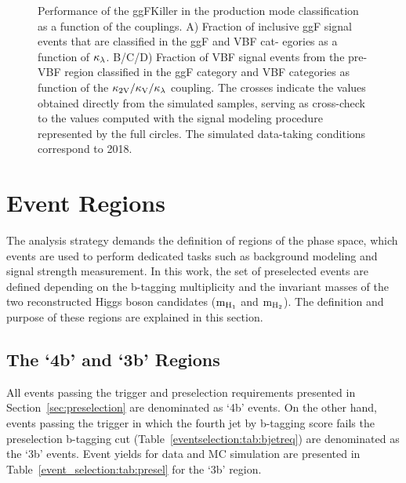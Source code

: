 \begin{figure}[htbp!]
\begin{center}
\end{center}
\caption[Performance of the ggFKiller in the production mode classification as a function of the couplings]{Performance of the ggFKiller in the production mode classification as a function of the couplings.  A) Fraction of inclusive ggF signal events that are classified in the ggF and VBF cat-
egories as a function of $\kappa_{\lambda}$. B/C/D) Fraction of VBF signal events from the pre-VBF region classified in the ggF category and VBF categories as function of the $\mathrm{\kappa_{2V} }/\mathrm{\kappa_{V} }/\kappa_{\lambda}$ coupling. The crosses indicate the values obtained directly from the simulated samples, serving as cross-check to the values computed with the signal modeling procedure represented by the full
circles. The simulated data-taking conditions correspond to 2018.}

\label{event_selection:fig:fractionggfvbfcategs_vs_kl}
\end{figure}

\clearpage

\section{Event Regions} \label{sec:regions}
The analysis strategy demands the definition of regions of the phase space, which events are used  to perform dedicated tasks such as background modeling and signal strength measurement. In this work, the set of preselected events are defined depending on the b-tagging multiplicity and the invariant masses of the two reconstructed Higgs boson candidates ($\mathrm{m_{H_{1}}}$ and $\mathrm{m_{H_{2}}}$). The definition and purpose of these regions are explained in this section.

\subsection{The `4b' and `3b' Regions} \label{sec:btagregions}

All events passing the trigger and preselection requirements presented in Section~\ref{sec:preselection} are denominated as `4b' events. On the other hand, events passing the trigger in which the fourth jet by b-tagging score fails the preselection b-tagging cut (Table~\ref{eventselection:tab:bjetreq}) are denominated as the `3b' events. Event yields for data and MC simulation are presented in Table~\ref{event_selection:tab:presel} for the `3b' region. 

